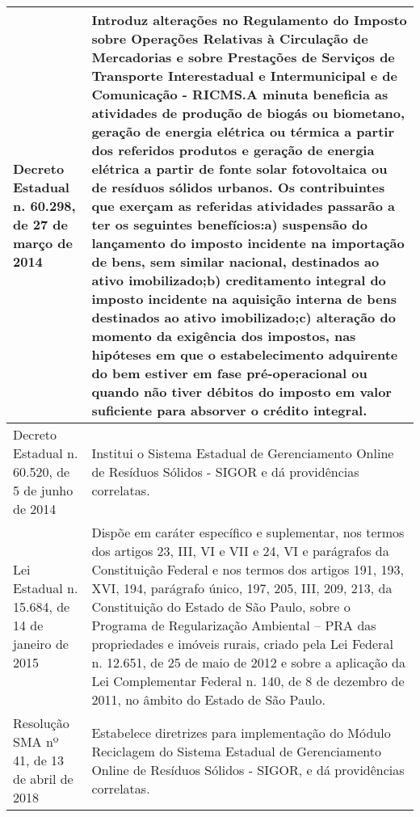 \begin{center}
\begin{longtable}{|p{}|p{}|}
			Decreto Estadual n. 60.298, de 27 de março de 2014 & Introduz  alterações  no  Regulamento  do  Imposto  sobre  Operações  Relativas  à Circulação  de  Mercadorias  e  sobre  Prestações  de  Serviços  de  Transporte Interestadual e Intermunicipal e de Comunicação - RICMS.\newline{}A minuta beneficia as atividades de produção de biogás ou biometano, geração de  energia  elétrica  ou  térmica  a  partir  dos  referidos  produtos  e  geração  de energia  elétrica  a  partir  de  fonte  solar  fotovoltaica  ou  de  resíduos  sólidos urbanos. Os contribuintes que exerçam as referidas atividades passarão a ter os seguintes benefícios:\newline{}a) suspensão do lançamento do imposto incidente na importação de bens, sem similar nacional, destinados ao ativo imobilizado;\newline{}b)  creditamento  integral  do  imposto  incidente  na  aquisição  interna  de  bens destinados ao ativo imobilizado;\newline{}c) alteração do momento da exigência dos impostos, nas hipóteses  em  que o estabelecimento adquirente do bem estiver em fase pré-operacional ou quando não tiver débitos do imposto em valor suficiente para absorver o crédito integral. \\
			\hline
			Decreto Estadual n. 60.520, de 5 de junho de 2014 & Institui  o  Sistema  Estadual  de  Gerenciamento  Online  de  Resíduos  Sólidos  - SIGOR e dá providências correlatas. \\
			\hline
			Lei  Estadual  n.  15.684,  de  14 de janeiro de 2015 & Dispõe em caráter específico e suplementar, nos termos dos artigos 23, III, VI e VII e 24, VI e parágrafos da Constituição Federal e nos termos dos artigos 191, 193,  XVI,  194,  parágrafo  único,  197,  205,  III,  209,  213,  da  Constituição  do Estado de São Paulo, sobre o Programa de Regularização Ambiental – PRA das propriedades e imóveis rurais, criado pela Lei Federal n. 12.651, de 25 de maio de  2012  e  sobre  a  aplicação  da  Lei  Complementar  Federal  n.  140,  de  8  de dezembro de 2011, no âmbito do Estado de São Paulo. \\
			\hline
			Resolução SMA nº 41, de 13 de abril de 2018 & Estabelece diretrizes para implementação do Módulo Reciclagem do Sistema Estadual de Gerenciamento Online de Resíduos Sólidos - SIGOR, e dá providências correlatas.\\
			\hline
			
		\end{longtable}
	\end{center}
	\renewcommand\LTcaptype{table}
	 
